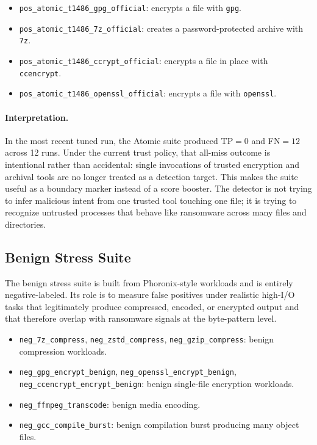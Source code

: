 \documentclass[twocolumn, 10pt]{scrartcl}
\begin{document}
\begin{itemize}
    \item \texttt{pos\_atomic\_t1486\_gpg\_official}: encrypts a file with \texttt{gpg}.
    \item \texttt{pos\_atomic\_t1486\_7z\_official}: creates a password-protected archive with \texttt{7z}.
    \item \texttt{pos\_atomic\_t1486\_ccrypt\_official}: encrypts a file in place with \texttt{ccencrypt}.
    \item \texttt{pos\_atomic\_t1486\_openssl\_official}: encrypts a file with \texttt{openssl}.
\end{itemize}

\paragraph{Interpretation.}
In the most recent tuned run, the Atomic suite produced TP$=0$ and FN$=12$ across 12 runs. Under the current trust policy, that all-miss outcome is intentional rather than accidental: single invocations of trusted encryption and archival tools are no longer treated as a detection target. This makes the suite useful as a boundary marker instead of a score booster. The detector is not trying to infer malicious intent from one trusted tool touching one file; it is trying to recognize untrusted processes that behave like ransomware across many files and directories.

\subsection{Benign Stress Suite}
The benign stress suite is built from Phoronix-style workloads and is entirely negative-labeled. Its role is to measure false positives under realistic high-I/O tasks that legitimately produce compressed, encoded, or encrypted output and that therefore overlap with ransomware signals at the byte-pattern level.

\begin{itemize}
    \item \texttt{neg\_7z\_compress}, \texttt{neg\_zstd\_compress}, \texttt{neg\_gzip\_compress}: benign compression workloads.
    \item \texttt{neg\_gpg\_encrypt\_benign}, \texttt{neg\_openssl\_encrypt\_benign}, \texttt{neg\_ccencrypt\_encrypt\_benign}: benign single-file encryption workloads.
    \item \texttt{neg\_ffmpeg\_transcode}: benign media encoding.
    \item \texttt{neg\_gcc\_compile\_burst}: benign compilation burst producing many object files.
\end{itemize}
\end{document}
